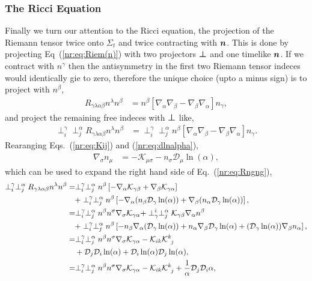 \subsubsection{The Ricci Equation}
Finally we turn our attention to the Ricci equation, the projection of the Riemann tensor twice onto $\Sigma_t$ and twice contracting with $\boldsymbol{n}$. This is done by projecting Eq~(\ref{nr:eq:Riem(n)}) with two projectors $\boldsymbol{\perp}$ and one timelike $\boldsymbol{n}$. If we contract with $n^\gamma$ then the antisymmetry in the first two Riemann tensor indeces would identically gie to zero, therefore the unique choice (upto a minus sign) is to project with $n^\beta$,
\begin{align}
R_{\gamma\lambda\alpha\beta}n^\lambda n^\beta &=
 n^\beta \left[ \nabla_\alpha\nabla_\beta-\nabla_\beta\nabla_\alpha\right]n_\gamma, 
\end{align}
and project the remaining free indeces with $\boldsymbol{\perp}$ like,
\begin{align} \label{nr:eq:Rngng}
\perp_i^\gamma \perp^\alpha_j R_{\gamma\lambda\alpha\beta}n^\lambda n^\beta &=
 \perp_i^\gamma \perp^\alpha_j n^\beta \left[ \nabla_\alpha\nabla_\beta-\nabla_\beta\nabla_\alpha\right]n_\gamma. 
\end{align}
Rearanging Eqs.~(\ref{nr:eq:Kij}) and (\ref{nr:eq:dlnalpha}),
\begin{align} \nabla_\sigma n_\mu &= -\mathcal{K}_{\mu\sigma}-n_\sigma \mathcal{D}_\mu \ln(\alpha), 
\end{align}
which can be used to expand the right hand side of Eq.~(\ref{nr:eq:Rngng}),
\begin{align} \label{nr:eq:Rngng}
\perp_i^\gamma \perp^\alpha_j R_{\gamma\lambda\alpha\beta}n^\lambda n^\beta &=
 \perp_i^\gamma \perp^\alpha_j n^\beta \left[ -\nabla_\alpha\mathcal{K}_{\gamma\beta}+\nabla_\beta \mathcal{K}_{\gamma\alpha}\right]  \\ \nonumber&\quad+
 \perp_i^\gamma \perp^\alpha_j n^\beta \left[ -\nabla_\alpha (n_\beta \mathcal{D}_\gamma \ln(\alpha)) +\nabla_\beta (n_\alpha \mathcal{D}_\gamma \ln(\alpha))\right], \\
 &=
 \perp_i^\gamma \perp^\alpha_j n^\beta n^\sigma \nabla_\sigma \mathcal{K}_{\gamma\alpha} +  \perp^i_\gamma \perp^\alpha_j   \mathcal{K}_{\gamma\beta} \nabla_\alpha n^\beta  \\ \nonumber&\quad+
 \perp_i^\gamma \perp^\alpha_j n^\beta \left[ -n_\beta \nabla_\alpha ( \mathcal{D}_\gamma \ln(\alpha)) +n_\alpha \nabla_\beta \mathcal{D}_\gamma \ln(\alpha)  
 + ( \mathcal{D}_\gamma \ln(\alpha))  \nabla_\beta n_\alpha\right], \\ 
  &=
 \perp_i^\gamma \perp^\alpha_j n^\beta n^\sigma \nabla_\sigma \mathcal{K}_{\gamma\alpha} -   \mathcal{K}_{ik} \mathcal{K}^k_{\,\,\,j}  \\ \nonumber&\quad+
 \mathcal{D}_j \mathcal{D}_i \ln(\alpha) + \mathcal{D}_i \ln(\alpha) \mathcal{D}_j \ln(\alpha)   , \\ 
 &=
 \perp_i^\gamma \perp^\alpha_j n^\beta n^\sigma \nabla_\sigma \mathcal{K}_{\gamma\alpha} -   \mathcal{K}_{ik} \mathcal{K}^k_{\,\,\,j}  + \frac{1}{\alpha} \mathcal{D}_j \mathcal{D}_i \alpha   ,
\end{align}
